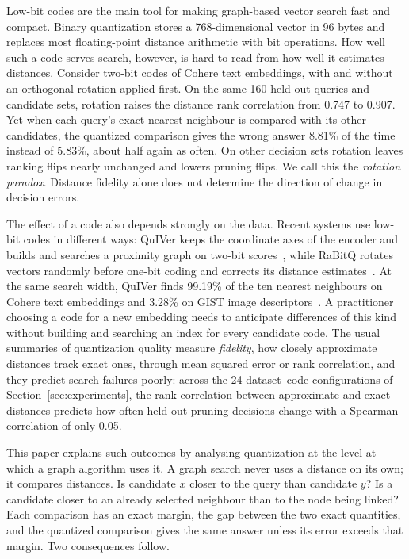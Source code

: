 \documentclass[twoside,11pt]{article}
\begin{document}
Low-bit codes are the main tool for making graph-based vector search fast and compact. Binary quantization stores a 768-dimensional vector in 96 bytes and replaces most floating-point distance arithmetic with bit operations. How well such a code serves search, however, is hard to read from how well it estimates distances. Consider two-bit codes of Cohere text embeddings, with and without an orthogonal rotation applied first. On the same 160 held-out queries and candidate sets, rotation raises the distance rank correlation from 0.747 to 0.907. Yet when each query's exact nearest neighbour is compared with its other candidates, the quantized comparison gives the wrong answer 8.81\% of the time instead of 5.83\%, about half again as often. On other decision sets rotation leaves ranking flips nearly unchanged and lowers pruning flips. We call this the \emph{rotation paradox}. Distance fidelity alone does not determine the direction of change in decision errors.

The effect of a code also depends strongly on the data. Recent systems use low-bit codes in different ways: QuIVer keeps the coordinate axes of the encoder and builds and searches a proximity graph on two-bit scores~\citep{xiao2026quiver}, while RaBitQ rotates vectors randomly before one-bit coding and corrects its distance estimates~\citep{gao2023rabitq}. At the same search width, QuIVer finds 99.19\% of the ten nearest neighbours on Cohere text embeddings and 3.28\% on GIST image descriptors~\citep{xiao2026quiver}. A practitioner choosing a code for a new embedding needs to anticipate differences of this kind without building and searching an index for every candidate code. The usual summaries of quantization quality measure \emph{fidelity}, how closely approximate distances track exact ones, through mean squared error or rank correlation, and they predict search failures poorly: across the 24 dataset--code configurations of Section~\ref{sec:experiments}, the rank correlation between approximate and exact distances predicts how often held-out pruning decisions change with a Spearman correlation of only 0.05.

This paper explains such outcomes by analysing quantization at the level at which a graph algorithm uses it. A graph search never uses a distance on its own; it compares distances. Is candidate $x$ closer to the query than candidate $y$? Is a candidate closer to an already selected neighbour than to the node being linked? Each comparison has an exact margin, the gap between the two exact quantities, and the quantized comparison gives the same answer unless its error exceeds that margin. Two consequences follow.
\end{document}
